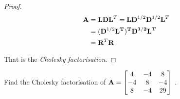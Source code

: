 \documentclass[a4paper]{article}
\numberwithin{equation}{section} %
\newcommand{\B}[1]{\textbf{\textup{#1}}} %
\begin{document}
\begin{proof}
\begin{equation*}
\begin{split}
	\B{A} & =\B{LD}\B{L}^{T}= \B{LD}^{1/2}\B{D}^{1/2}\B{L}^{T} \\
    & = (\B{D}^{1/2}\bf{L}^{T})^{T} \B{D}^{1/2}\B{L}^{T} \\
    & = \B{R}^{T}\B{R}
\end{split}
\end{equation*}

That is the \textit{Cholesky factorisation}.

\end{proof}

\begin{exmp}
Find the Cholesky factorisation of $\B{A}=
	\begin{bmatrix}
    4 & -4 & 8\\
    -4 & 8 & -4\\
    8 & -4 &29
    \end{bmatrix}
$ \cite{lec_notes_leykekhman}.
\end{exmp} 
\end{document}
